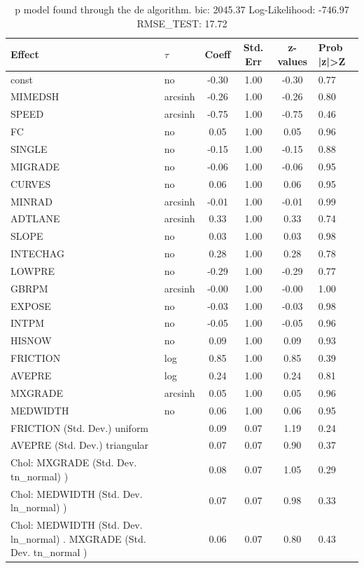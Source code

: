 \begin{table}
	\caption{p model found through the de algorithm. bic: 2045.37 Log-Likelihood: -746.97 RMSE_TEST: 17.72}
	\begin{center}
		\begin{tabular}{|l|l|c|c|c|l|}
			\hline
			Effect & $\tau$ & Coeff & Std. Err & z-values & Prob |z|>Z \\
			\hline
			const & no & -0.30 & 1.00 & -0.30 & 0.77 \\
			\hline
			MIMEDSH & arcsinh & -0.26 & 1.00 & -0.26 & 0.80 \\
			\hline
			SPEED & arcsinh & -0.75 & 1.00 & -0.75 & 0.46 \\
			\hline
			FC & no & 0.05 & 1.00 & 0.05 & 0.96 \\
			\hline
			SINGLE & no & -0.15 & 1.00 & -0.15 & 0.88 \\
			\hline
			MIGRADE & no & -0.06 & 1.00 & -0.06 & 0.95 \\
			\hline
			CURVES & no & 0.06 & 1.00 & 0.06 & 0.95 \\
			\hline
			MINRAD & arcsinh & -0.01 & 1.00 & -0.01 & 0.99 \\
			\hline
			ADTLANE & arcsinh & 0.33 & 1.00 & 0.33 & 0.74 \\
			\hline
			SLOPE & no & 0.03 & 1.00 & 0.03 & 0.98 \\
			\hline
			INTECHAG & no & 0.28 & 1.00 & 0.28 & 0.78 \\
			\hline
			LOWPRE & no & -0.29 & 1.00 & -0.29 & 0.77 \\
			\hline
			GBRPM & arcsinh & -0.00 & 1.00 & -0.00 & 1.00 \\
			\hline
			EXPOSE & no & -0.03 & 1.00 & -0.03 & 0.98 \\
			\hline
			INTPM & no & -0.05 & 1.00 & -0.05 & 0.96 \\
			\hline
			HISNOW & no & 0.09 & 1.00 & 0.09 & 0.93 \\
			\hline
			FRICTION & log & 0.85 & 1.00 & 0.85 & 0.39 \\
			\hline
			AVEPRE & log & 0.24 & 1.00 & 0.24 & 0.81 \\
			\hline
			MXGRADE & arcsinh & 0.05 & 1.00 & 0.05 & 0.96 \\
			\hline
			MEDWIDTH & no & 0.06 & 1.00 & 0.06 & 0.95 \\
			\hline
			FRICTION (Std. Dev.) uniform &  & 0.09 & 0.07 & 1.19 & 0.24 \\
			\hline
			AVEPRE (Std. Dev.) triangular &  & 0.07 & 0.07 & 0.90 & 0.37 \\
			\hline
			 Chol: MXGRADE (Std. Dev. tn_normal) ) &  & 0.08 & 0.07 & 1.05 & 0.29 \\
			\hline
			 Chol: MEDWIDTH (Std. Dev. ln_normal) ) &  & 0.07 & 0.07 & 0.98 & 0.33 \\
			\hline
			 Chol: MEDWIDTH (Std. Dev. ln_normal) . MXGRADE (Std. Dev.   tn_normal ) &  & 0.06 & 0.07 & 0.80 & 0.43 \\
			\hline
		\end{tabular}
	\end{center}
\end{table}